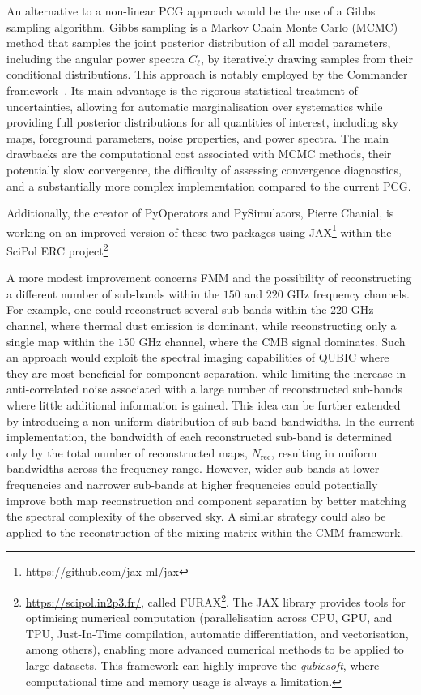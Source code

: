 \documentclass[../../thesis.tex]{subfiles}
\begin{document}
An alternative to a non-linear PCG approach would be the use of a Gibbs sampling algorithm. Gibbs sampling is a Markov Chain Monte Carlo (MCMC) method that samples the joint posterior distribution of all model parameters, including the angular power spectra $C_\ell$, by iteratively drawing samples from their conditional distributions. This approach is notably employed by the Commander framework~\cite{Commander2008}. Its main advantage is the rigorous statistical treatment of uncertainties, allowing for automatic marginalisation over systematics while providing full posterior distributions for all quantities of interest, including sky maps, foreground parameters, noise properties, and power spectra. The main drawbacks are the computational cost associated with MCMC methods, their potentially slow convergence, the difficulty of assessing convergence diagnostics, and a substantially more complex implementation compared to the current PCG.

Additionally, the creator of PyOperators and PySimulators, Pierre Chanial, is working on an improved version of these two packages using JAX\footnote{\url{https://github.com/jax-ml/jax}} within the SciPol ERC project\footnote{\url{https://scipol.in2p3.fr/}, called FURAX\footnote{\url{https://github.com/CMBSciPol/furax}}. The JAX library provides tools for optimising numerical computation (parallelisation across CPU, GPU, and TPU, Just-In-Time compilation, automatic differentiation, and vectorisation, among others), enabling more advanced numerical methods to be applied to large datasets. This framework can highly improve the \emph{qubicsoft}, where computational time and memory usage is always a limitation.}

A more modest improvement concerns FMM and the possibility of reconstructing a different number of sub-bands within the $150$ and $220$ GHz frequency channels. For example, one could reconstruct several sub-bands within the $220$ GHz channel, where thermal dust emission is dominant, while reconstructing only a single map within the $150$ GHz channel, where the CMB signal dominates. Such an approach would exploit the spectral imaging capabilities of QUBIC where they are most beneficial for component separation, while limiting the increase in anti-correlated noise associated with a large number of reconstructed sub-bands where little additional information is gained.
This idea can be further extended by introducing a non-uniform distribution of sub-band bandwidths. In the current implementation, the bandwidth of each reconstructed sub-band is determined only by the total number of reconstructed maps, $N_{\text{rec}}$, resulting in uniform bandwidths across the frequency range. However, wider sub-bands at lower frequencies and narrower sub-bands at higher frequencies could potentially improve both map reconstruction and component separation by better matching the spectral complexity of the observed sky. A similar strategy could also be applied to the reconstruction of the mixing matrix within the CMM framework.
\end{document}
